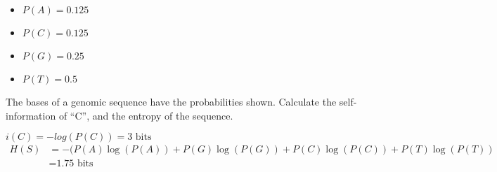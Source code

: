 \begin{question}
\begin{itemize}
\item $P(A) = 0.125$
\item $P(C) = 0.125$
\item $P(G) = 0.25$
\item $P(T) = 0.5$
\end{itemize}
The bases of a genomic sequence have the probabilities shown. Calculate the self-information of “C”, and the entropy of the sequence. 
\end{question}
\begin{solution}
$i(C) = -log(P(C)) = \text{3 bits}$ \\

\begin{equation}
\begin{aligned}
H(S) &= -( P(A)\log(P(A)) + P(G)\log(P(G)) + P(C)\log(P(C)) + P(T)\log(P(T)) \\ 
&= \text{1.75 bits}
\end{aligned}
\end{equation}
\end{solution}

